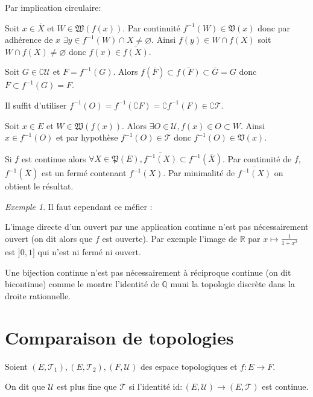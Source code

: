 \documentclass[a4paper, 11pt, french]{book}
\newenvironment{itemise}{\itemize}{\enditemize}
\theoremstyle{plain} %
\theoremstyle{definition} %
\theoremstyle{remark} %
\newtheorem{exemple}{Exemple}
\newcommand{\1}{\mathds{1}}
\newcommand{\id}{\mathrm{id}}
\newcommand\vide{\varnothing}
\newcommand{\inv}[1]{#1^{-1}}
\newcommand{\Q}{\mathbb{Q}}
\newcommand{\R}{\mathbb{R}}
\begin{document}
\demonstration
Par implication circulaire:
\begin{itemise}
	\item Soit $x\in\overline{X}$ et $W\in\mathfrak{W}(f(x))$.
	Par continuité $\inv{f}(W)\in\mathfrak{V}(x)$ donc par adhérence de $x$ $\exists y\in\inv{f}(W)\cap X\neq\vide$.
	Ainsi $f(y)\in W\cap f(X)$ soit $W\cap f(X)\neq\vide$ donc $f(x)\in\overline{f(X)}$.
	\item Soit $G\in\complement\mathscr{U}$ et $F=\inv{f}(G)$.
	Alors $f(\overline{F})\subset\overline{f(F)}\subset\overline{G}=G$ donc $\overline{F}\subset\inv{f}(G)=F$.
	\item Il suffit d'utiliser $\inv{f}(O)=\inv{f}(\complement F)=\complement\inv{f}(F)\in\complement\mathscr{T}$.
	\item Soit $x\in E$ et $W\in\mathfrak{W}(f(x))$.
	Alors $\exists O\in\mathscr{U}, f(x)\in O\subset W$.
	Ainsi $x\in\inv{f}(O)$ et par hypothèse $\inv{f}(O)\in\mathscr{T}$ donc $\inv{f}(O)\in\mathfrak{V}(x)$.
\end{itemise}

\proposition
Si $f$ est continue alors $\forall X\in\mathfrak{P}(E), \overline{\inv{f}(X)}\subset\inv{f}(\overline{X})$.
\demonstration
Par continuité de $f$, $\inv{f}(\overline{X})$ est un fermé contenant $\inv{f}(X)$.
Par minimalité de $\overline{\inv{f}(X)}$ on obtient le résultat.

\begin{exemple} Il faut cependant ce méfier :
	\begin{itemise}
		\item L'image directe d'un ouvert par une application continue n'est pas nécessairement ouvert (on dit alors que $f$ est ouverte).
		Par exemple l'image de $\R$ par $x\mapsto\frac{1}{1+x^2}$ est $]0,1]$ qui n'est ni fermé ni ouvert.
		\item Une bijection continue n'est pas nécessairement à réciproque continue (on dit bicontinue) comme le montre l'identité de $\Q$ muni la topologie discrète dans la droite rationnelle.
	\end{itemise}
\end{exemple}

\section{Comparaison de topologies}
Soient $(E, \mathscr{T}_1), (E, \mathscr{T}_2), (F, \mathscr{U})$ des espace topologiques et $f\colon E\rightarrow F$.

On dit que $\mathscr{U}$ est plus fine que $\mathscr{T}$ si l'identité $\id\colon(E, \mathscr{U})\rightarrow(E, \mathscr{T})$ est continue.
\end{document}
